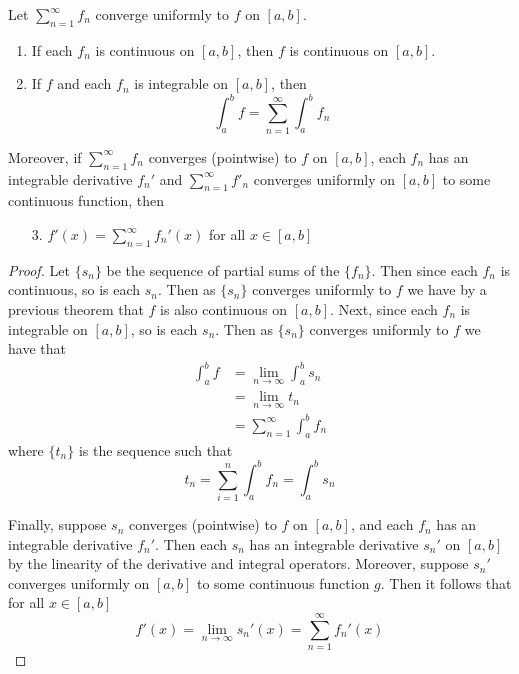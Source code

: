 \documentclass[12pt, a4paper, oneside, openright, titlepage]{book}
\begin{document}
\begin{cor}
    Let $\sum\limits_{n=1}^{\infty}f_n$ converge uniformly to $f$ on $[a,b]$. \begin{enumerate}
        \item If each $f_n$ is continuous on $[a,b]$, then $f$ is continuous on $[a,b]$.
        \item If $f$ and each $f_n$ is integrable on $[a,b]$, then \begin{equation*}
                \int_a^bf = \sum\limits_{n=1}^{\infty}\int_a^bf_n
        \end{equation*}
    \end{enumerate}
    Moreover, if $\sum\limits_{n=1}^{\infty}f_n$ converges (pointwise) to $f$ on $[a,b]$, each $f_n$ has an integrable derivative $f_n'$ and $\sum\limits_{n=1}^{\infty}f'_n$ converges uniformly on $[a,b]$ to some continuous function, then \begin{enumerate}
        \item[3.] $f'(x) = \sum\limits_{n=1}^{\infty}f_n'(x)$   for all $x \in [a,b]$
    \end{enumerate}
\end{cor}
\begin{proof}
    Let $\{s_n\}$ be the sequence of partial sums of the $\{f_n\}$. Then since each $f_n$ is continuous, so is each $s_n$. Then as $\{s_n\}$ converges uniformly to $f$ we have by a previous theorem that $f$ is also continuous on $[a,b]$. Next, since each $f_n$ is integrable on $[a,b]$, so is each $s_n$. Then as $\{s_n\}$ converges uniformly to $f$ we have that \begin{align*}
        \int_a^bf &= \lim\limits_{n\rightarrow \infty}\int_a^bs_n \\
        &= \lim\limits_{n\rightarrow\infty}t_n \\
        &= \sum\limits_{n=1}^{\infty}\int_a^bf_n
    \end{align*}
    where $\{t_n\}$ is the sequence such that \begin{equation*}
        t_n = \sum\limits_{i=1}^n\int_a^bf_n = \int_a^bs_n
    \end{equation*}

    Finally, suppose $s_n$ converges (pointwise) to $f$ on $[a,b]$, and each $f_n$ has an integrable derivative $f_n'$. Then each $s_n$ has an integrable derivative $s_n'$ on $[a,b]$ by the linearity of the derivative and integral operators. Moreover, suppose $s_n'$ converges uniformly on $[a,b]$ to some continuous function $g$. Then it follows that for all $x \in [a,b]$ \begin{equation*}
        f'(x) = \lim\limits_{n\rightarrow \infty}s_n'(x) = \sum\limits_{n=1}^{\infty}f_n'(x)
    \end{equation*}
\end{proof}
\end{document}
